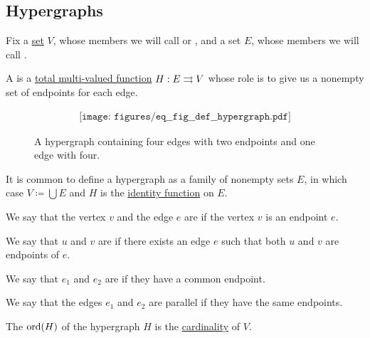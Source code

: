 \subsection{Hypergraphs}\label{subsec:hypergraphs}

\begin{definition}\label{def:hypergraph}
  Fix a \hyperref[def:set]{set} \( V \), whose members we will call  or , and a set \( E \), whose members we will call .

  A  is a \hyperref[def:multi_valued_function/total]{total multi-valued function} \( H: E \rightrightarrows V \) whose role is to give us a nonempty set of endpoints for each edge.

  \begin{figure}[h]
    \begin{equation}\label{eq:fig:def:hypergraph}
      \begin{aligned}
        \texttt{[image: figures/eq\_\_fig\_\_def\_\_hypergraph.pdf]}
      \end{aligned}
    \end{equation}
    \caption{A hypergraph containing four edges with two endpoints and one edge with four.}\label{fig:def:hypergraph}
  \end{figure}

  It is common to define a hypergraph as a family of nonempty sets \( E \), in which case \( V \coloneqq \bigcup E \) and \( H \) is the \hyperref[def:multi_valued_function/identity]{identity function} on \( E \).

  \begin{thmenum}
     We say that the vertex \( v \) and the edge \( e \) are  if the vertex \( v \) is an endpoint \( e \).

     We say that \( u \) and \( v \) are  if there exists an edge \( e \) such that both \( u \) and \( v \) are endpoints of \( e \).

     We say that \( e_1 \) and \( e_2 \) are  if they have a common endpoint.

     We say that the edges \( e_1 \) and \( e_2 \) are parallel if they have the same endpoints.

     The  \( \operatorname{ord}(H) \) of the hypergraph \( H \) is the \hyperref[thm:cardinality_existence]{cardinality} of \( V \).


\end{thmenum}
\end{definition}
